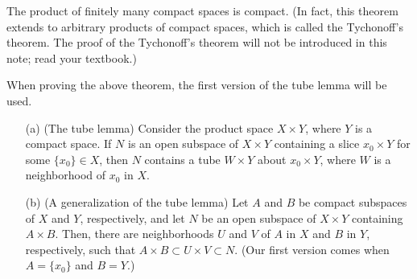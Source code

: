 \begin{thm}\label{products of compact spaces}
    The product of finitely many compact spaces is compact.
    (In fact, this theorem extends to arbitrary products of compact spaces, which is called the Tychonoff's theorem.
    The proof of the Tychonoff's theorem will not be introduced in this note; read your textbook.)
\end{thm}
When proving the above theorem, the first version of the tube lemma will be used.
\begin{lem}\label{tube lemmas}
    \begin{enumerate}
        \item[(a)]
        {
            (The tube lemma)
            Consider the product space $X\times Y$, where $Y$ is a compact space.
            If $N$ is an open subspace of $X\times Y$ containing a slice $x_0\times Y$ for some $\{x_0\}\in X$, then $N$ contains a tube $W\times Y$ about $x_0\times Y$, where $W$ is a neighborhood of $x_0$ in $X$.
        }
        \item[(b)]
        {
            (A generalization of the tube lemma)
            Let $A$ and $B$ be compact subspaces of $X$ and $Y$, respectively, and let $N$ be an open subspace of $X\times Y$ containing $A\times B$.
            Then, there are neighborhoods $U$ and $V$ of $A$ in $X$ and $B$ in $Y$, respectively, such that $A\times B\subset U\times V\subset N$.
            (Our first version comes when $A=\{x_0\}$ and $B=Y$.)
        }
    \end{enumerate}
\end{lem}
